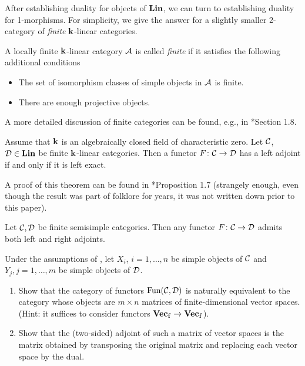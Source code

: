  After establishing duality for objects of $\mathbf{Lin}$, we can turn to establishing
 duality for 1-morphisms. For simplicity, we give the answer for a slightly
 smaller 2-category of \emph{finite} $\mathbf{k}$-linear categories.

 \begin{definition}\label{d:finite}
    A locally finite $\mathbf{k}$-linear category $\mathcal{A}$ is called \emph{finite} if
    it satisfies the following additional conditions
    \begin{itemize}
      \item The set of isomorphism classes of simple objects in $\mathcal{A}$ is
        finite.
      \item There are enough projective objects.
    \end{itemize}
\end{definition}
A more detailed discussion of finite categories can be found, e.g., in
*{Section 1.8}.

 \begin{theorem}\label{t:exact-adjoint}
  Assume that $\mathbf{k}$ is an algebraically closed field of characteristic zero. Let
  $\mathcal{C}$, $\mathcal{D}\in \mathbf{Lin}$ be finite $\mathbf{k}$-linear categories. Then a functor
  $F\colon \mathcal{C}\to \mathcal{D}$ has a left adjoint if and only if it is left exact.
\end{theorem}
A proof of this theorem can be found in *{Proposition 1.7}
(strangely enough, even though the result was part of folklore for years, it was
not written down prior to this paper).

\begin{corollary}\label{c:adjoint-semisimple}
  Let $\mathcal{C}, \mathcal{D}$ be finite semisimple categories. Then any functor $F\colon
  \mathcal{C}\to \mathcal{D}$ admits both left and right adjoints.
\end{corollary}

\begin{exercise}\label{ec:adjoint-semisimple}
  Under the assumptions of , let $X_i$, $i=1, \dots,
  n$ be simple objects of $\mathcal{C}$ and $Y_j, j=1, \dots, m$ be simple objects of
  $\mathcal{D}$.

  \begin{enumerate}
    \item Show that the category of functors $\operatorname{Fun}(\mathcal{C}, \mathcal{D})$ is naturally
      equivalent to the category whose objects are $m\times n$ matrices of
    finite-dimensional vector spaces. (Hint: it suffices to consider functors
    $\mathbf{Vec_f}\to \mathbf{Vec_f}$).

    \item Show that the (two-sided) adjoint of such a matrix of vector spaces is
    the matrix obtained by transposing the original matrix and replacing each
    vector space by the dual.
  \end{enumerate}
\end{exercise}

